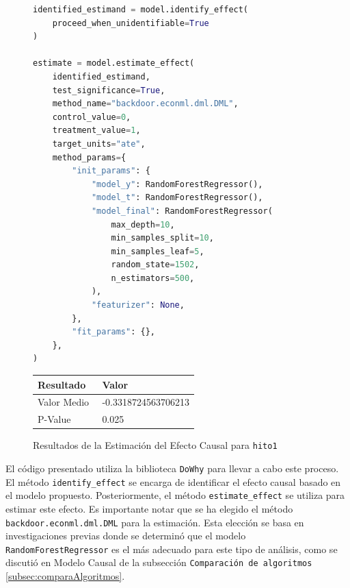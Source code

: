 \begin{figure}[H]
    \centering
    \begin{minipage}{0.5\textwidth}
        \begin{lstlisting}[language=Python, caption=Proceso de Identificación y Estimación del Efecto Causal, label=lst:IdentificarEstimarefectoCausalHito1]
identified_estimand = model.identify_effect(
    proceed_when_unidentifiable=True
)

estimate = model.estimate_effect(
    identified_estimand,
    test_significance=True,
    method_name="backdoor.econml.dml.DML",
    control_value=0,
    treatment_value=1,
    target_units="ate",
    method_params={
        "init_params": {
            "model_y": RandomForestRegressor(),
            "model_t": RandomForestRegressor(),
            "model_final": RandomForestRegressor(
                max_depth=10,
                min_samples_split=10,
                min_samples_leaf=5,
                random_state=1502,
                n_estimators=500,
            ),
            "featurizer": None,
        },
        "fit_params": {},
    },
)
\end{lstlisting}
    \end{minipage}
    \hfill
    \begin{minipage}{0.45\textwidth}
        \centering        
        \begin{tabular}{lp{0.6\linewidth}}
            \toprule
            \textbf{Resultado} & \textbf{Valor} \\
            \midrule
            Valor Medio & -0.3318724563706213 \\
            P-Value & 0.025 \\
            \bottomrule
        \end{tabular}
        \caption{Resultados de la Estimación del Efecto Causal para \texttt{hito1}}
        \label{tab:efecto_causal_hito1}
    \end{minipage}
\end{figure}

El código presentado utiliza la biblioteca \texttt{DoWhy} para llevar a cabo este proceso. El método \texttt{identify\_effect} se encarga de identificar el efecto causal basado en el modelo propuesto. Posteriormente, el método \texttt{estimate\_effect} se utiliza para estimar este efecto. Es importante notar que se ha elegido el método \texttt{backdoor.econml.dml.DML} para la estimación. Esta elección se basa en investigaciones previas donde se determinó que el modelo \texttt{RandomForestRegressor} es el más adecuado para este tipo de análisis, como se discutió en Modelo Causal de la subsección \texttt{Comparación de algoritmos} \ref{subsec:comparaAlgoritmos}.

